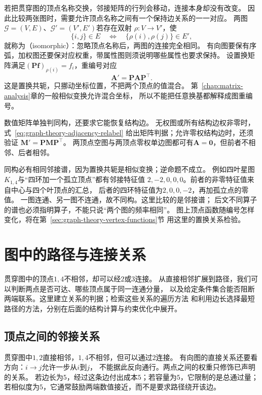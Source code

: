 若把贯穿图的顶点名称交换，邻接矩阵的行列会移动，连接本身却没有改变。
因此比较两张图时，需要允许顶点名称之间有一个保持边关系的一一对应。
两图\(\mathcal G=(V,E)\)、\(\mathcal G'=(V',E')\)若存在双射
\(\rho:V\to V'\)，使
\[
  \{i,j\}\in E
  \quad\Longleftrightarrow\quad
  \{\rho(i),\rho(j)\}\in E',
\]
就称为（isomorphic）：忽略顶点名称后，两图的连接完全相同。
有向图要保有序弧，加权图还要保对应权重，带属性图则须说明哪些属性也要求保持。
设置换矩阵满足\((\bm P\bm f)_{\rho(i)}=f_i\)，重编号对应
\begin{equation}
  \bm A'=\bm P\bm A\bm P^\top.
  \label{eq:graph-theory-adjacency-relabel}
\end{equation}
这是置换共轭，只挪动坐标位置，不把两个顶点的值混合。
第~\ref{chap:matrix-analysis}章的一般相似变换允许混合坐标，
所以不能把任意换基都解释成图重编号。

数值矩阵单独判同构，还要求它能恢复结构边。
无权图或所有结构边权非零时，式~\eqref{eq:graph-theory-adjacency-relabel}
给出矩阵判据；允许零权结构边时，还须验证
\(\bm M'=\bm P\bm M\bm P^\top\)。
两顶点空图与两顶点零权单边图都可有\(\bm A=\bm0\)，但前者不相邻、后者相邻。

同构必有相同邻接谱，因为置换共轭是相似变换；逆命题不成立。
例如四叶星图\(K_{1,4}\)与“四环加一个孤立顶点”都有邻接特征值
\(2,-2,0,0,0\)。前者的非零特征值来自中心与四个叶顶点的汇总，
后者的四环特征值为\(2,0,0,-2\)，再加孤立点的零值。
一图连通、另一图不连通，故不同构。这里比较的是邻接谱；
后文不同算子的谱也必须指明算子，不能只说“两个图的频率相同”。
图上顶点函数随编号怎样变化，将在第~\ref{sec:graph-theory-vertex-functions}节
用这里的置换关系检验。

\section{图中的路径与连接关系}
\label{sec:graph-theory-paths-traversal}

贯穿图中的顶点\(1,4\)不相邻，却可以经\(2\)或\(3\)连接。
从直接相邻扩展到路径，我们可以判断两点是否可达、哪些顶点属于同一连通分量，
以及给定条件集合能否阻断两端联系。这里建立关系的判据；检索这些关系的遍历方法
和利用边长选择最短路径的方法，分别在后面的结构计算与约束优化中展开。

\subsection{顶点之间的邻接关系}

贯穿图中\(1,2\)直接相邻，\(1,4\)不相邻，但可以通过\(2\)连接。
有向图的直接关系还要看方向：\(i\to j\)允许一步从\(i\)到\(j\)，
不能据此反向通行。两点之间的权重只修饰已声明的关系。
若边长为\(5\)，经过这条边付出成本\(5\)；若容量为\(5\)，它限制的是总通过量；
若相似度为\(5\)，它通常鼓励两端数值接近，而不是要求路径绕开该边。

